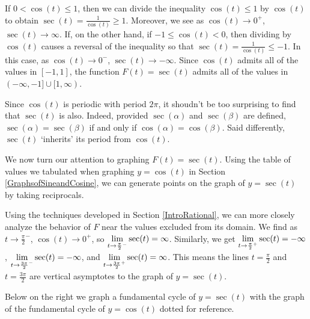 \smallskip

 If $0 < \cos(t) \leq 1$, then we can divide the inequality $\cos(t) \leq 1$ by  $\cos(t)$ to obtain  $\sec(t) = \frac{1}{\cos(t)} \geq 1$.  Moreover, we see as  $\cos(t) \rightarrow 0^{+}$, $\sec(t) \rightarrow \infty$.   If, on the other hand, if $-1 \leq \cos(t) < 0$, then dividing by $\cos(t)$ causes a reversal of the inequality so that $\sec(t) = \frac{1}{\cos(t)} \leq -1$.  In this case, as $\cos(t) \rightarrow 0^{-}$,  $\sec(t) \rightarrow -\infty$.   Since $\cos(t)$ admits all of the values in $[-1,1]$, the function $F(t) = \sec(t)$ admits all of the values in $(-\infty, -1] \cup [1,\infty)$.  

\smallskip

Since $\cos(t)$ is periodic with period $2\pi$, it shoudn't be too surprising to find that $\sec(t)$ is also.  Indeed, provided $\sec(\alpha)$ and  $\sec(\beta)$ are defined, $\sec(\alpha) = \sec(\beta)$ if and only if $\cos(\alpha) = \cos(\beta)$.  Said differently,  $\sec(t)$ `inherits' its period from $\cos(t)$. 

\smallskip

We now turn our attention to graphing $F(t) = \sec(t)$.  Using the table of values we tabulated when graphing $y = \cos(t)$ in Section \ref{GraphsofSineandCosine}, we can generate points on the graph of $y = \sec(t)$ by taking reciprocals.

\smallskip

Using the techniques developed in Section \ref{IntroRational}, we can more closely analyze the behavior of $F$ near the values excluded from its domain.  We find  as $t \rightarrow \frac{\pi}{2}^{-}$, $\cos(t) \rightarrow 0^{+}$, so $\displaystyle{\lim_{t \rightarrow \frac{\pi}{2}^{-}}\sec(t) = \infty}$.  Similarly, we get $\displaystyle{\lim_{t \rightarrow \frac{\pi}{2}^{+}}\sec(t) = -\infty}$, $\displaystyle{\lim_{t \rightarrow \frac{3\pi}{2}^{-}}\sec(t) = -\infty}$, and $\displaystyle{\lim_{t \rightarrow \frac{3\pi}{2}^{+}}\sec(t)  = \infty}$.  This means the lines $t = \frac{\pi}{2}$ and $t = \frac{3\pi}{2}$ are vertical asymptotes to the graph of $y = \sec(t)$.


\smallskip

Below on the right we graph a fundamental cycle of $y = \sec(t)$  with the graph of the fundamental cycle of $y = \cos(t)$ dotted for reference.  

\smallskip



